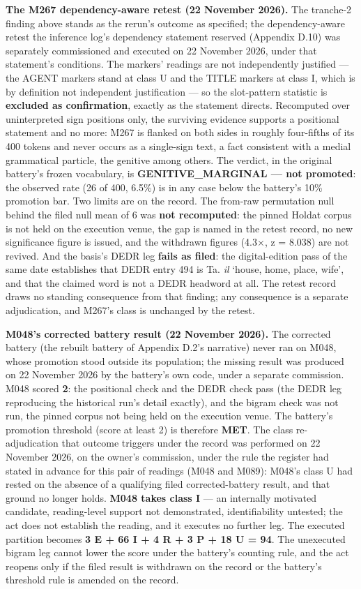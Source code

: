 \documentclass[11pt]{article}
\begin{document}
\textbf{The M267 dependency-aware retest (22 November 2026).}
The tranche-2 finding above stands as the rerun's outcome as
specified; the dependency-aware retest the inference log's
dependency statement reserved (Appendix D.10) was separately
commissioned and executed on 22 November 2026, under that
statement's conditions. The markers' readings are not
independently justified --- the AGENT markers stand at class U
and the TITLE markers at class I, which is by definition not
independent justification --- so the slot-pattern statistic is
\textbf{excluded as confirmation}, exactly as the statement
directs. Recomputed over uninterpreted sign positions only, the
surviving evidence supports a positional statement and no more:
M267 is flanked on both sides in roughly four-fifths of its 400
tokens and never occurs as a single-sign text, a fact
consistent with a medial grammatical particle, the genitive
among others. The verdict, in the original battery's frozen
vocabulary, is \textbf{GENITIVE\_MARGINAL --- not promoted}:
the observed rate (26 of 400, 6.5\%) is in any case below the
battery's 10\% promotion bar. Two limits are on the record. The
from-raw permutation null behind the filed null mean of 6 was
\textbf{not recomputed}: the pinned Holdat corpus is not held
on the execution venue, the gap is named in the retest record,
no new significance figure is issued, and the withdrawn figures
(4.3$\times$, z = 8.038) are not revived. And the basis's DEDR
leg \textbf{fails as filed}: the digital-edition pass of the
same date establishes that DEDR entry 494 is Ta. \emph{il}
`house, home, place, wife', and that the claimed word is not a
DEDR headword at all. The retest record draws no standing
consequence from that finding; any consequence is a separate
adjudication, and M267's class is unchanged by the retest.

\textbf{M048's corrected battery result (22 November 2026).}
The corrected battery (the rebuilt battery of Appendix D.2's
narrative) never ran on M048, whose promotion stood outside its
population; the missing result was produced on 22 November 2026
by the battery's own code, under a separate commission. M048
scored \textbf{2}: the positional check and the DEDR check pass
(the DEDR leg reproducing the historical run's detail exactly),
and the bigram check was not run, the pinned corpus not being
held on the execution venue. The battery's promotion threshold
(score at least 2) is therefore \textbf{MET}. The class
re-adjudication that outcome triggers under the record was
performed on 22 November 2026, on the owner's commission, under
the rule the register had stated in advance for this pair of
readings (M048 and M089): M048's class U had rested on the
absence of a qualifying filed corrected-battery result, and
that ground no longer holds. \textbf{M048 takes class I} ---
an internally motivated candidate, reading-level support not
demonstrated, identifiability untested; the act does not
establish the reading, and it executes no further leg. The
executed partition becomes \textbf{3 E + 66 I + 4 R + 3 P +
18 U = 94}. The unexecuted bigram leg cannot lower the score
under the battery's counting rule, and the act reopens only if
the filed result is withdrawn on the record or the battery's
threshold rule is amended on the record.
\end{document}
